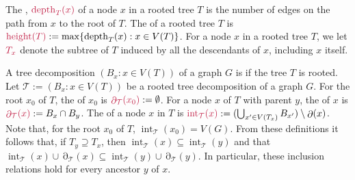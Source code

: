 \documentclass{patmorin}
\DeclareMathOperator{\depth}{depth}
\DeclareMathOperator{\height}{height}
\DeclareMathOperator{\interior}{int}
\DeclareMathOperator{\boundary}{\partial}
\begin{document}
The , $\mathdefin{\depth_T(x)}$ of a node $x$ in a rooted tree $T$ is the number of edges on the path from $x$ to the root of $T$. The  of a rooted tree $T$ is $\mathdefin{\height(T)}:=\max\{\depth_T(x):x\in V(T)\}$. For a node $x$ in a rooted tree $T$, we let $\mathdefin{T_x}$ denote the subtree of $T$ induced by all the descendants of $x$, including $x$ itself.

A tree decomposition $(B_x:x\in V(T))$ of a graph $G$ is  if the tree $T$ is rooted.  Let $\mathcal{T}:=(B_x:x\in V(T))$ be a rooted tree decomposition of a graph $G$.    For the root $x_0$ of $T$, the  of $x_0$ is $\mathdefin{\boundary_{\mathcal{T}}(x_0)}:=\emptyset$.  For a node $x$ of $T$ with parent $y$, the  of $x$ is $\mathdefin{\boundary_\mathcal{T}(x)}:=B_x\cap B_y$.  The  of a node $x$ in $T$ is $\mathdefin{\interior_\mathcal{T}(x)}:=(\bigcup_{x'\in V(T_x)} B_{x'})\setminus \boundary(x)$.  Note that, for the root $x_0$ of $T$, $\interior_{\mathcal{T}}(x_0)=V(G)$.  From these definitions it follows that, if $T_y\supseteq T_x$, then $\interior_{\mathcal{T}}(x)\subseteq\interior_{\mathcal{T}}(y)$ and that $\interior_\mathcal{T}(x) \cup \boundary_\mathcal{T}(x)\subseteq \interior_\mathcal{T}(y) \cup \boundary_\mathcal{T}(y)$. In particular, these inclusion relations hold for every ancestor $y$ of $x$.



\end{document}
